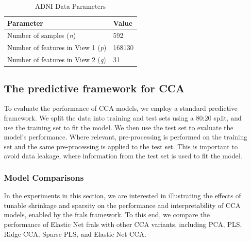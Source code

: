 \begin{table}
    \centering
    \caption{ADNI Data Parameters}
    \begin{tabular}{| l | l |}
        \hline
        \textbf{Parameter}                        & \textbf{Value} \\
        \hline
        Number of samples (\textit{n})            & 592            \\
        Number of features in View 1 (\textit{p}) & 168130         \\
        Number of features in View 2 (\textit{q}) & 31             \\
        \hline
    \end{tabular}\label{tab:adni-parameters}
\end{table}

\subsection{The predictive framework for CCA}\label{subsec:the-predictive-framework-for-cca}

To evaluate the performance of CCA models, we employ a standard predictive framework.
We split the data into training and test sets using a 80:20 split, and use the training set to fit the model.
We then use the test set to evaluate the model's performance.
Where relevant, pre-processing is performed on the training set and the same pre-processing is applied to the test set.
This is important to avoid data leakage, where information from the test set is used to fit the model.

\subsubsection{Model Comparisons}
In the experiments in this section, we are interested in illustrating the effects of tunable shrinkage and sparsity on the performance and interpretability of CCA models, enabled by the \acrshort{frals} framework.
To this end, we compare the performance of Elastic Net \acrshort{frals} with other CCA variants, including PCA, PLS, Ridge CCA, Sparse PLS, and Elastic Net CCA\@.

